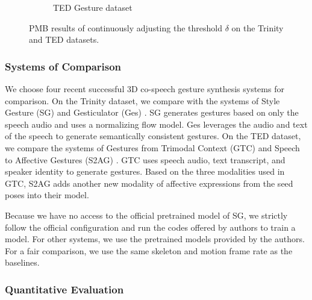 \begin{figure}[t]
\begin{subfigure}[t]{0.47\linewidth}
        \caption{TED Gesture dataset}
        \label{fig:table1b}
    \end{subfigure}
    \Description{}
    \caption{PMB results of continuously adjusting the threshold $\delta$ on the Trinity and TED datasets.}
    \label{fig:table1}
\end{figure}

\subsubsection{Systems of Comparison}
We choose four recent successful 3D co-speech gesture synthesis systems for comparison. On the Trinity dataset, we compare with the systems of Style Gesture (SG) \cite{alexanderson2020style} and Gesticulator (Ges) \cite{kucherenko2020gesticulator}. SG generates gestures based on only the speech audio and uses a normalizing flow model. Ges leverages the audio and text of the speech to generate semantically consistent gestures. On the TED dataset, we compare the systems of Gestures from Trimodal Context (GTC) \cite{yoon2020speech} and Speech to Affective Gestures (S2AG) \cite{bhattacharya2021speech2affectivegestures}. GTC uses speech audio, text transcript, and speaker identity to generate gestures. Based on the three modalities used in GTC, S2AG adds another new modality of affective expressions from the seed poses into their model.

Because we have no access to the official pretrained model of SG, we strictly follow the official configuration and run the codes offered by authors to train a model. For other systems, we use the pretrained models provided by the authors. For a fair comparison, we use the same skeleton and motion frame rate as the baselines.

\subsubsection{Quantitative Evaluation}

